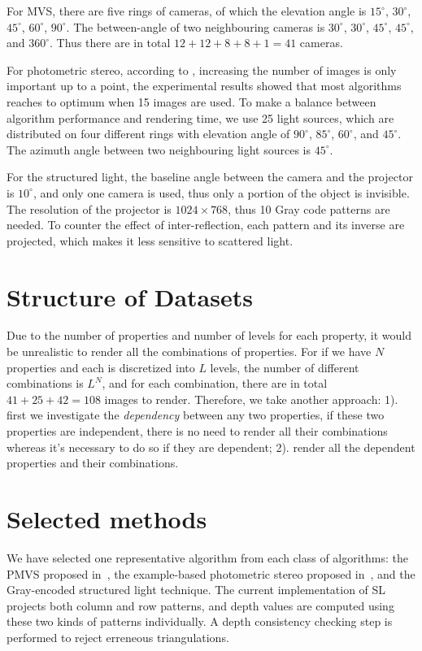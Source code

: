 For MVS, there are five rings of cameras, of which the elevation angle is $15^\circ$, $30^\circ$, $45^\circ$, $60^\circ$, $90^\circ$. The between-angle of two neighbouring cameras is $30^\circ$, $30^\circ$, $45^\circ$, $45^\circ$, and $360^\circ$. Thus there are in total $12+12+8+8+1=41$ cameras.

For photometric stereo, according to \cite{Berkiten:2016:ARB}, increasing the number of images is only important up to a point, the experimental results showed that most algorithms reaches to optimum when 15 images are used. To make a balance between algorithm performance and rendering time, we use 25 light sources, which are distributed on four different rings with elevation angle of $90^\circ$, $85^\circ$, $60^\circ$, and $45^\circ$. The azimuth angle between two neighbouring light sources is $45^\circ$.

For the structured light, the baseline angle between the camera and the projector is $10^\circ$, and only one camera is used, thus only a portion of the object is invisible. The resolution of the projector is $1024\times768$, thus 10 Gray code patterns are needed. To counter the effect of inter-reflection, each pattern and its inverse are projected, which makes it less sensitive to scattered light.

\section{Structure of Datasets}
Due to the number of properties and number of levels for each property, it would be unrealistic to render all the combinations of properties. For if we have $N$ properties and each is discretized into $L$ levels, the number of different combinations is $L^N$, and for each combination, there are in total $41+25+42=108$ images to render. Therefore, we take another approach: 1). first we investigate the \textit{dependency} between any two properties, if these two properties are independent, there is no need to render all their combinations whereas it's necessary to do so if they are dependent; 2). render all the dependent properties and their combinations.

\section{Selected methods}
We have selected one representative algorithm from each class of algorithms: the PMVS proposed in~\cite{furukawa2010accurate}, the example-based photometric stereo proposed in~\cite{hertzmann2005example}, and the Gray-encoded structured light technique. The current implementation of SL projects both column and row patterns, and depth values are computed using these two kinds of patterns individually. A depth consistency checking step is performed to reject erreneous triangulations.

